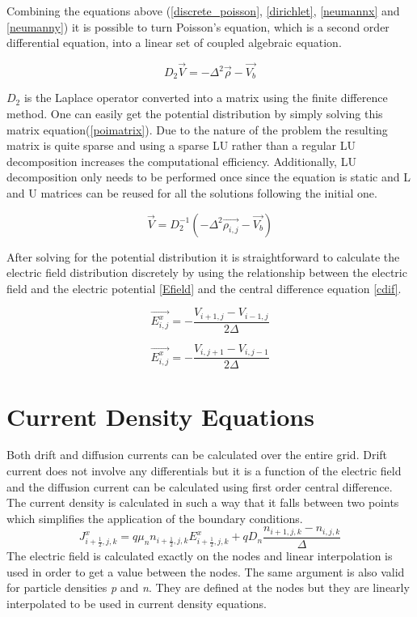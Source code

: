 \begin{doublespace}
Combining the equations above (\ref{discrete_poisson}, \ref{dirichlet}, \ref{neumannx} and \ref{neumanny}) it is possible to turn Poisson's equation, which is a second order differential equation, into a linear set of coupled algebraic equation.

\begin{equation}
D_{2}\vec{V}=-\Delta^2\vec{\rho}-\vec{V_b}
\end{equation}

$D_{2}$ is the Laplace operator converted into a matrix using the finite difference method. One can easily get the potential distribution by simply solving this matrix equation(\ref{poimatrix}). Due to the nature of the problem the resulting matrix is quite sparse and using a sparse LU rather than a regular LU decomposition increases the computational efficiency. Additionally, LU decomposition only needs to be performed once since the equation is static and L and U matrices can be reused for all the solutions following the initial one. 

\begin{equation}
\vec{V}=D_{2}^{-1}(-\Delta^2\vec{\rho_{i,j}}-\vec{V_b})
\label{poimatrix}
\end{equation}

After solving for the potential distribution it is straightforward to calculate the electric field distribution discretely by using the relationship between the electric field and the electric potential \eqref{Efield} and the central difference equation \eqref{cdif}. 

\begin{equation}
\vec{E^x_{i,j}}=-\frac{V_{i+1,j}-V_{i-1,j}}{2\Delta}
\end{equation}

\begin{equation}
\vec{E^x_{i,j}}=-\frac{V_{i,j+1}-V_{i,j-1}}{2\Delta}
\end{equation}

\clearpage
\section{Current Density Equations}
 Both drift and diffusion currents can be calculated over the entire grid. Drift current does not involve any differentials but it is a function of the electric field and the diffusion current can be calculated using first order central difference\cite{Dragica1}. The current density is calculated in such a way that it falls between two points which simplifies the application of the boundary conditions.
\begin{equation}
J^x_{i+\frac{1}{2},j,k}=q\mu_n n_{i+\frac{1}{2},j,k} E^x_{i+\frac{1}{2},j,k}+q D_n \frac{n_{i+1,j,k}-n_{i,j,k}}{\Delta}
\end{equation}
The electric field is calculated exactly on the nodes and linear interpolation is used in order to get a value between the nodes. The same argument is also valid for particle densities \textit{p} and \textit{n}. They are defined at the nodes but they are linearly interpolated to be used in current density equations.


\end{doublespace}

